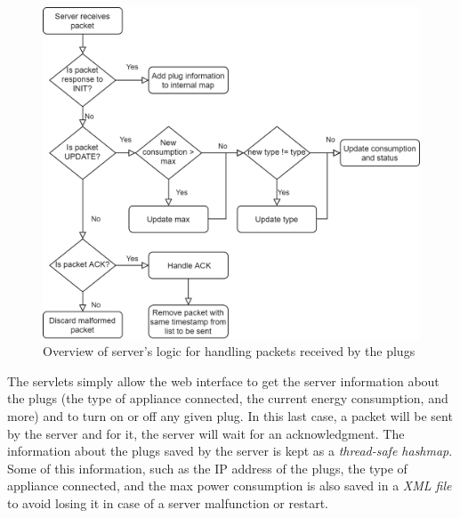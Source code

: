 \documentclass[conference]{IEEEtran}
\begin{document}
	\begin{figure}
		\centering
		\includegraphics[width=\linewidth]{assets/server_logic}
		\caption{Overview of server's logic for handling packets received by the plugs}
		\label{fig:server_logic}
	\end{figure}
	The servlets simply allow the web interface to get the server information about the plugs (the type of appliance connected, the current energy consumption, and more) and to turn on or off any given plug. In this last case, a packet will be sent by the server and for it, the server will wait for an acknowledgment. The information about the plugs saved by the server is kept as a \textit{thread-safe hashmap}. Some of this information, such as the IP address of the plugs, the type of appliance connected, and the max power consumption is also saved in a \textit{XML file} to avoid losing it in case of a server malfunction or restart.
	
\end{document}
